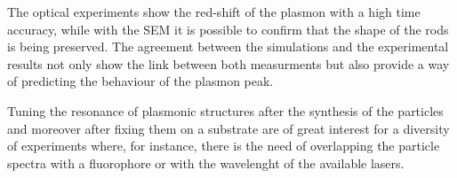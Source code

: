 \documentclass[twocolumn]{article}
\begin{document}
The optical experiments show the red-shift of the plasmon with a high time
accuracy, while with the SEM it is possible to confirm that the shape of the
rods is being preserved. The agreement between the simulations and the
experimental results not only show the link between both measurments but also
provide a way of predicting the behaviour of the plasmon peak. 

Tuning the resonance of plasmonic structures after the synthesis of the
particles and moreover after fixing them on a substrate are of great interest
for a diversity of experiments where, for instance, there is the need of
overlapping the particle spectra with a fluorophore or with the wavelenght of
the available lasers.

{}

\end{document}
